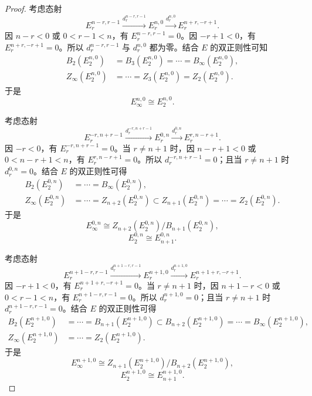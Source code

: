 \begin{proof}
考虑态射
\[
E_r^{n-r,r-1}\xrightarrow{d_r^{n-r,r-1}}E_r^{n,0}\xrightarrow{d_r^{n,0}}E_r^{n+r,-r+1}.
\]
因 $n-r<0$ 或 $0<r-1<n$，有 $E_r^{n-r,r-1}=0$。因 $-r+1<0$，有 $E_r^{n+r,-r+1}=0$。所以 $d_r^{n-r,r-1}$ 与 $d_r^{n,0}$ 都为零。结合 $E$ 的双正则性可知
\[
\begin{aligned}
B_2(E_2^{n,0})&=B_3(E_2^{n,0})=\cdots=B_\infty(E_2^{n,0}),\\
Z_\infty(E_2^{n,0})&=\cdots=Z_3(E_2^{n,0})=Z_2(E_2^{n,0}).
\end{aligned}
\]
于是
\begin{equation*}\tag{3}
E_\infty^{n,0}\cong E_2^{n,0}.
\end{equation*}

考虑态射
\[
E_r^{-r,n+r-1}\xrightarrow{d_r^{-r,n+r-1}}E_r^{0,n}\xrightarrow{d_r^{0,n}}E_r^{r,n-r+1}.
\]
因 $-r<0$，有 $E_r^{-r,n+r-1}=0$。当 $r\ne n+1$ 时，因 $n-r+1<0$ 或 $0<n-r+1<n$，有 $E_r^{r,n-r+1}=0$。所以 $d_r^{-r,n+r-1}=0$；且当 $r\ne n+1$ 时 $d_r^{0,n}=0$。结合 $E$ 的双正则性可得
\[
\begin{aligned}
B_2(E_2^{0,n})&=\cdots=B_\infty(E_2^{0,n}),\\
Z_\infty(E_2^{0,n})&=\cdots=Z_{n+2}(E_2^{0,n})\subset Z_{n+1}(E_2^{0,n})=\cdots=Z_2(E_2^{0,n}).
\end{aligned}
\]
于是
\begin{equation*}\tag{4}
E_\infty^{0,n}\cong Z_{n+2}(E_2^{0,n})/B_{n+1}(E_2^{0,n}),
\end{equation*}
\begin{equation*}\tag{5}
E_2^{0,n}\cong E_{n+1}^{0,n}.
\end{equation*}

考虑态射
\[
E_r^{n+1-r,r-1}\xrightarrow{d_r^{n+1-r,r-1}}E_r^{n+1,0}\xrightarrow{d_r^{n+1,0}}E_r^{n+1+r,-r+1}.
\]
因 $-r+1<0$，有 $E_r^{n+1+r,-r+1}=0$。当 $r\ne n+1$ 时，因 $n+1-r<0$ 或 $0<r-1<n$，有 $E_r^{n+1-r,r-1}=0$。所以 $d_r^{n+1,0}=0$；且当 $r\ne n+1$ 时 $d_r^{n+1-r,r-1}=0$。结合 $E$ 的双正则性可得
\[
\begin{aligned}
B_2(E_2^{n+1,0})&=\cdots=B_{n+1}(E_2^{n+1,0})\subset B_{n+2}(E_2^{n+1,0})=\cdots=B_\infty(E_2^{n+1,0}),\\
Z_\infty(E_2^{n+1,0})&=\cdots=Z_2(E_2^{n+1,0}).
\end{aligned}
\]
于是
\begin{equation*}\tag{6}
E_\infty^{n+1,0}\cong Z_{n+1}(E_2^{n+1,0})/B_{n+2}(E_2^{n+1,0}),
\end{equation*}
\begin{equation*}\tag{7}
E_2^{n+1,0}\cong E_{n+1}^{n+1,0}.
\end{equation*}


\end{proof}
